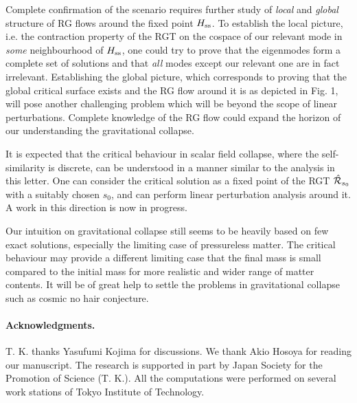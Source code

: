 Complete confirmation of the scenario requires further study
of {\em local} and {\em global} structure of RG flows around the fixed
point $H_{\rm ss}$.  To establish the local picture, i.e. the
contraction
property of the RGT on the cospace of our relevant mode in {\em some}
neighbourhood of $H_{\rm ss}$, one could try to prove that the
eigenmodes form
a complete set of solutions and that {\em all} modes except our
relevant one are in fact irrelevant.
Establishing the global picture, which corresponds to
proving that the global critical surface exists and
the RG flow around it is as depicted in Fig. 1,
will pose another challenging problem
which will be beyond the scope of linear perturbations.
Complete knowledge of the RG flow could expand the  horizon of our
understanding the gravitational collapse.



It is expected that the critical behaviour in scalar field collapse,
where the self-similarity is discrete, can be understood in a
 manner similar to the analysis in this letter.
One can consider the critical solution as
a fixed point of the RGT $\hat {\cal R}_{s_0}$
with a suitably chosen $s_0$, and can perform
linear perturbation analysis  around it.
A work in this direction is now in progress.



Our intuition on gravitational collapse still seems to be heavily
based on few exact solutions, especially the limiting case of
pressureless matter.
The critical behaviour may
provide a different limiting case
that the final mass is small compared to the initial mass
for more realistic and wider range of matter contents.
It will be of great help to settle the problems in gravitational
collapse such as cosmic no hair conjecture.



\paragraph*{Acknowledgments.}
T. K. thanks Yasufumi Kojima for discussions.
We thank Akio Hosoya for reading our manuscript.
The research is supported in part by Japan Society for the Promotion of
Science (T. K.).
All the computations were performed on
several work stations
of Tokyo Institute of Technology.


